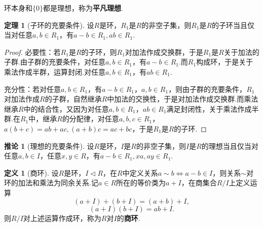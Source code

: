 \documentclass[12pt]{ctexart}
\theoremstyle{definition}
\newtheorem{definition}{定义}
\newtheorem{theorem}{定理}
\newtheorem{corollary}{推论}
\theoremstyle{plain}
\begin{document}
	环本身和$\{0\}$都是理想，称为\textbf{平凡理想}.
	\begin{theorem}[子环的充要条件]
		设$R$是环，$R_1$是$R$的非空子集，则$R_1$是$R$的子环当且仅当对任意$a,b\in R_1$，有$a-b\in R_1,ab\in R_1$.
	\end{theorem}
	\begin{proof}
		必要性：若$R_1$是$R$的子环，则$R_1$对加法作成交换群，于是$R_1$是$R$关于加法的子群.由子群的充要条件，对任意$a,b\in R_1$，有$a-b\in R_1$.而$R_1$构成环，于是关于乘法作成半群，运算封闭.对任意$a,b\in R_1$，有$ab\in R_1$.
		
		充分性：若对任意$a,b\in R_1$，有$a-b\in R_1$，$a,b\in R_1$，则由子群的充要条件，$R_1$对加法作成$R$的子群，自然继承$R$中加法的交换性，于是对加法作成交换群.而乘法继承$R$中的结合性，又因为对任意$a,b\in R_1$，$ab\in R_1$满足封闭性，关于乘法作成半群.在$R_1$中，继承$R$的分配律，对任意$a,b,c\in R_1$，$a(b+c)=ab+ac,(a+b)c=ac+bc$，于是$R_1$是$R$的子环.
	\end{proof}
	\begin{corollary}[理想的充要条件]
		设$R$是环，$I$是$R$的非空子集，则$I$是$R$的理想当且仅当对任意$a,b\in I$，任意$x,y\in R$，有$a-b\in R_1,xa,ay\in R_1$.
	\end{corollary}
	\begin{definition}[商环]
		设$R$是环，$I\lhd R$，在$R$中定义关系$a\sim b\iff a-b\in I$，则关系$\sim$对环的加法和乘法为同余关系.记$a\in R$所在的等价类为$a+I$，在商集合$R/I$上定义运算
		$$(a+I)+(b+I)=(a+b)+I,$$
		$$(a+I)(b+I)=ab+I.$$
		则$R/I$对上述运算作成环，称为$R$对$I$的\textbf{商环}.
	\end{definition}
\end{document}
